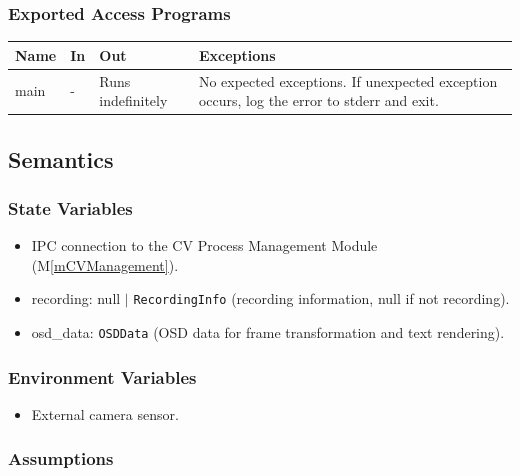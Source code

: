 \documentclass[12pt, titlepage]{article}
\newcommand{\mref}[1]{M\ref{#1}}
\begin{document}
\subsubsection{Exported Access Programs}

\begin{center}
  \begin{tabular}{p{3cm} p{4cm} p{4cm} p{3.5cm}}
    \hline
    \textbf{Name} & \textbf{In} & \textbf{Out}      & \textbf{Exceptions}                                                                       \\
    \hline
    main          & -           & Runs indefinitely & No expected exceptions. If unexpected exception occurs, log the error to stderr and exit. \\
    \hline
  \end{tabular}
\end{center}

\subsection{Semantics}

\subsubsection{State Variables}

\begin{itemize}
  \item IPC connection to the CV Process Management Module (\mref{mCVManagement}).
  \item recording: null $|$ \texttt{RecordingInfo} (recording information, null if not
        recording).
  \item osd\_data: \texttt{OSDData} (OSD data for frame transformation and text
        rendering).
\end{itemize}

\subsubsection{Environment Variables}

\begin{itemize}
  \item External camera sensor.
\end{itemize}

\subsubsection{Assumptions}
\end{document}
